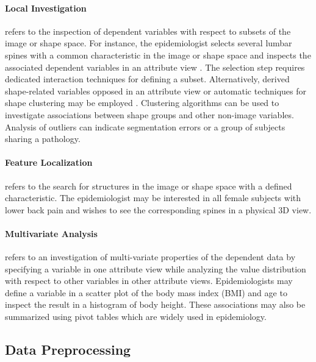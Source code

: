 \documentclass[journal]{style/vgtc} 			          %
\begin{document}
\paragraph{Local Investigation} refers to the inspection of dependent variables with respect to subsets of the image or shape space.
%
For instance, the epidemiologist selects several lumbar spines with a common characteristic in the image or shape space and inspects the associated dependent variables in an attribute view \cite{Hermann2014}.
%
The selection step requires dedicated interaction techniques for defining a subset.
%
Alternatively, derived shape-related variables opposed in an attribute view or automatic techniques for shape clustering may be employed \cite{Klemm2013VMV}.
%
Clustering algorithms can be used to investigate associations between shape groups and other non-image variables.
%
Analysis of outliers can indicate segmentation errors or a group of subjects sharing a pathology.

\paragraph{Feature Localization} refers to the search for structures in the image or shape space with a defined characteristic.
%
The epidemiologist may be interested in all female subjects with lower back pain and wishes to see the corresponding spines in a physical 3D view.

\paragraph{Multivariate Analysis} refers to an investigation of multi-variate properties of the dependent data by specifying a variable in one attribute view while analyzing the value distribution with respect to other variables in other attribute views.
%
Epidemiologists may define a variable in a scatter plot of the body mass index (BMI) and age to inspect the result in a histogram of body height.
%
These associations may also be summarized using pivot tables which are widely used in epidemiology.

\subsection{Data Preprocessing} \label{Data Preprocessing}
\end{document}
